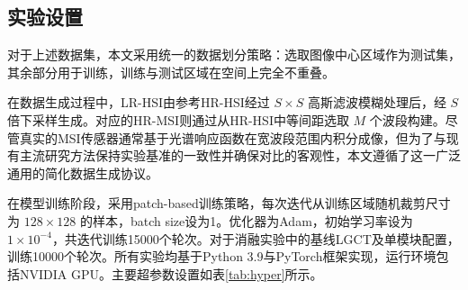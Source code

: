 \documentclass[UTF8,a4paper,11pt]{ctexart}
\begin{document}
\subsection{实验设置}
对于上述数据集，本文采用统一的数据划分策略：选取图像中心区域作为测试集，其余部分用于训练，训练与测试区域在空间上完全不重叠。

在数据生成过程中，LR-HSI由参考HR-HSI经过 $S \times S$ 高斯滤波模糊处理后，经 $S$ 倍下采样生成。对应的HR-MSI则通过从HR-HSI中等间距选取 $M$ 个波段构建。尽管真实的MSI传感器通常基于光谱响应函数在宽波段范围内积分成像，但为了与现有主流研究方法保持实验基准的一致性并确保对比的客观性，本文遵循了这一广泛通用的简化数据生成协议。

在模型训练阶段，采用patch-based训练策略，每次迭代从训练区域随机裁剪尺寸为 $128 \times 128$ 的样本，batch size设为1。优化器为Adam，初始学习率设为 $1 \times 10^{-4}$，共迭代训练15000个轮次。对于消融实验中的基线LGCT及单模块配置，训练10000个轮次。所有实验均基于Python 3.9与PyTorch框架实现，运行环境包括NVIDIA GPU。主要超参数设置如表\ref{tab:hyper}所示。
\end{document}
